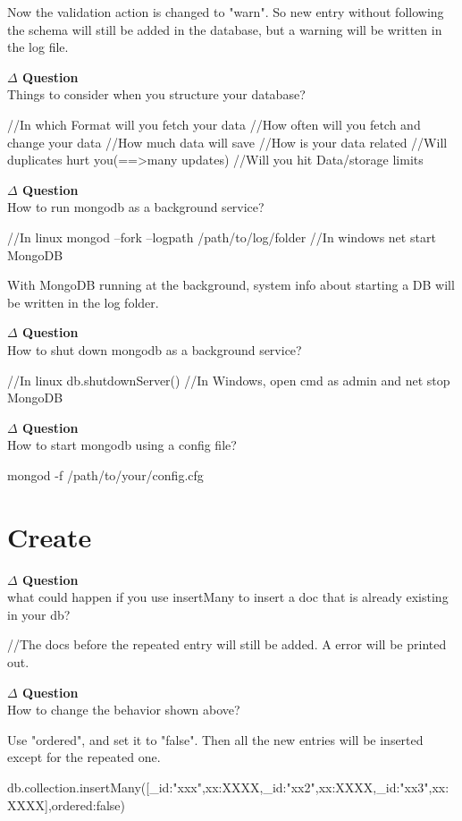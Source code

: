 \documentclass[12pt]{article}
\newenvironment{que}
    { \begin{mdframed}[backgroundcolor=green!20] \textbf{$\Delta$ Question} \\}
    {  \end{mdframed}}
\begin{document}
Now the validation action is changed to "warn". So new entry without following the schema will still be added in the database, but a warning will be written in the log file.
\begin{que}
Things to consider when you structure your database?
\end{que}
\begin{code}
//In which Format will you fetch your data
//How often will you fetch and change your data
//How much data will save 
//How is your data related
//Will duplicates hurt you(==>many updates)
//Will you hit Data/storage limits
\end{code}
\begin{que}
How to run mongodb as a background service?
\end{que}
\begin{code}
//In linux
mongod --fork --logpath /path/to/log/folder
//In windows
net start MongoDB
\end{code}
With MongoDB running at the background, system info about starting a DB will be written in the log folder.
\begin{que}
How to shut down mongodb as a background service?
\end{que}
\begin{code}
//In linux
db.shutdownServer()
//In Windows, open cmd as admin and
net stop MongoDB
\end{code}
\begin{que}
How to start mongodb using a config file?
\end{que}
\begin{code}
mongod -f /path/to/your/config.cfg
\end{code}
\newpage
\section{Create}
\begin{que}
what could happen if you use insertMany to insert a doc that is already existing in your db?
\end{que}
\begin{code}
//The docs before the repeated entry will still be added. A error will be printed out.
\end{code}
\begin{que}
How to change the behavior shown above?
\end{que}
Use "ordered", and set it to "false". Then all the new entries will be inserted except for the repeated one.
\begin{code}
db.collection.insertMany([{_id:"xxx",xx:XXXX},{_id:"xx2",xx:XXXX},{_id:"xx3",xx:XXXX}],{ordered:false})
\end{code}
\end{document}
